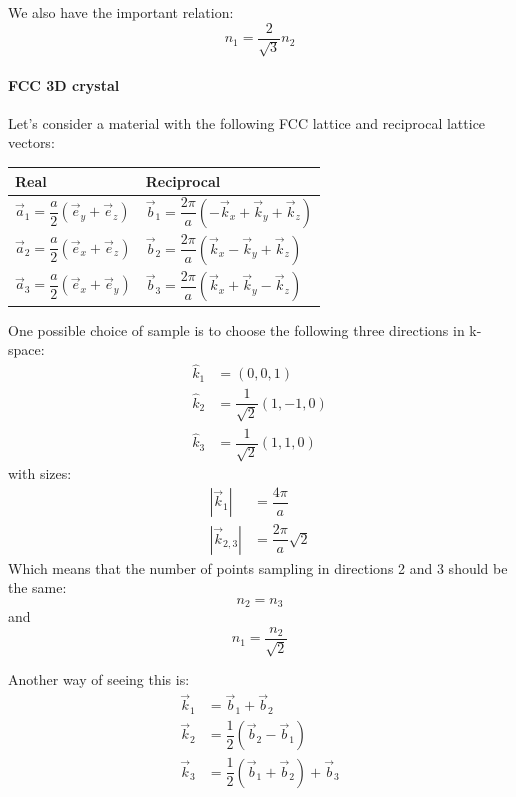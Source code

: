 \documentclass[a4paper,12pt]{report}
\begin{document}
We also have the important relation:
\begin{equation}
 n_1 = \dfrac{2}{\sqrt{3}} n_2
\end{equation}



\paragraph{FCC 3D crystal}

 Let's consider a material with the following FCC lattice and reciprocal lattice vectors:
 \medskip

\begin{tabular}{l|l}
\centering
Real & Reciprocal \\[0.1cm]\hline
$\vec{a}_1 = \dfrac{a}{2}\left( \vec{e}_y + \vec{e}_z\right) $ &
$\vec{b}_1 = \dfrac{2\pi}{a}\left( -\vec{k}_x + \vec{k}_y  + \vec{k}_z\right) $\\[0.2cm]
$\vec{a}_2 = \dfrac{a}{2}\left( \vec{e}_x + \vec{e}_z\right) $ &
$\vec{b}_2 = \dfrac{2\pi}{a}\left( \vec{k}_x - \vec{k}_y + \vec{k}_z\right) $\\[0.2cm]
$\vec{a}_3 = \dfrac{a}{2}\left( \vec{e}_x + \vec{e}_y\right) $ &
$\vec{b}_3 = \dfrac{2\pi}{a}\left( \vec{k}_x + \vec{k}_y - \vec{k}_z\right) $\\[0.2cm]
\hline
\end{tabular}
\bigskip

One possible choice of sample is to choose the following three directions in k-space:
\begin{align*}
 \hat{k}_1 &= (0,0,1)\\
 \hat{k}_2 &= \dfrac{1}{\sqrt{2}}(1,-1,0)\\
 \hat{k}_3 &= \dfrac{1}{\sqrt{2}}(1,1,0)
\end{align*}
 with sizes:
\begin{align*}
  |\vec{k}_1| &= \dfrac{4\pi}{a} \\
  |\vec{k}_{2,3}| &= \dfrac{2\pi}{a}\sqrt{2}
\end{align*}
Which means that the number of points sampling in directions 2 and 3 should be the same:
\begin{equation}
 n_2 = n_3
\end{equation}
and
\begin{equation*}
 n_1 = \dfrac{n_2}{\sqrt{2}}
\end{equation*}


Another way of seeing this is:
\begin{align*}
 \vec{k}_1 &= \vec{b}_1 + \vec{b}_2 \\
 \vec{k}_2 &= \dfrac{1}{2}(\vec{b}_2 - \vec{b}_1) \\
 \vec{k}_3 &= \dfrac{1}{2}(\vec{b}_1 + \vec{b}_2) + \vec{b}_3
\end{align*}
\end{document}
